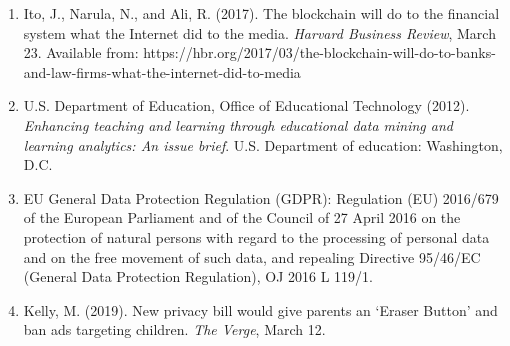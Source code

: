 \documentclass{article}
\begin{document}
\begin{enumerate}
    \item Ito, J., Narula, N., and Ali, R. (2017). The blockchain will do to the financial system what the Internet did to the media. \textit{Harvard Business Review}, March 23. Available from: https://hbr.org/2017/03/the-blockchain-will-do-to-banks-and-law-firms-what-the-internet-did-to-media
    \item U.S. Department of Education, Office of Educational Technology (2012). \textit{Enhancing teaching and learning through educational data mining and learning analytics: An issue brief}. U.S. Department of education: Washington, D.C. 
    \item EU General Data Protection Regulation (GDPR): Regulation (EU) 2016/679 of the European Parliament and of the Council of 27 April 2016 on the protection of natural persons with regard to the processing of personal data and on the free movement of such data, and repealing Directive 95/46/EC (General Data Protection Regulation), OJ 2016 L 119/1.
    \item Kelly, M. (2019). New privacy bill would give parents an ‘Eraser Button’ and ban ads targeting children. \textit{The Verge}, March 12.

\end{enumerate}
\end{document}

